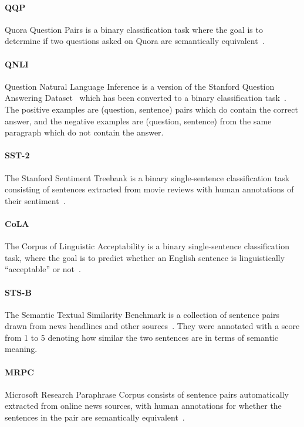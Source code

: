 \documentclass[11pt,a4paper]{article}
\begin{document}
\paragraph{QQP} Quora Question Pairs is a binary classification task where the goal is to determine if two questions asked on Quora are semantically equivalent~\cite{chen-etal:2018:_quora}.

\paragraph{QNLI} Question Natural Language Inference is a version of the Stanford Question Answering Dataset~\cite{rajpurkar-etal:2016:_squad} which has been converted to a binary classification task~\cite{wang-etal:2018:_glue}. The positive examples are (question, sentence) pairs which do contain the correct answer, and the negative examples are (question, sentence) from the same paragraph which do not contain the answer.

\paragraph{SST-2} The Stanford Sentiment Treebank is a binary single-sentence classification task consisting of sentences extracted from movie reviews with human annotations of their sentiment~\cite{socher-etal:2013:_recur}.

\paragraph{CoLA} The Corpus of Linguistic Acceptability is a binary single-sentence classification task, where the goal is to predict whether an English sentence is linguistically ``acceptable'' or not~\cite{warstadt-singh-bowman:2018:_corpus}.

\paragraph{STS-B} The Semantic Textual Similarity Benchmark is a collection of sentence pairs drawn from news headlines and other sources~\cite{cer-etal:2017}. They were annotated with a score from 1 to 5 denoting how similar the two sentences are in terms of semantic meaning. 

\paragraph{MRPC} Microsoft Research Paraphrase Corpus consists of sentence pairs automatically extracted from online news sources, with human annotations for whether the sentences in the pair are semantically equivalent~\cite{dolan-brockett:2005:_autom}.
\end{document}
